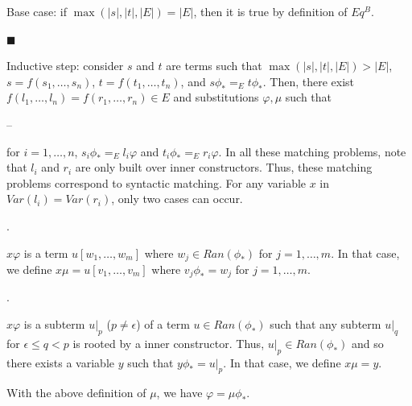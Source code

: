 Base case: if $\max(|s|,|t|,|E|)=|E|$, then it is true by definition of $Eq^{B}$.\par
 
 
 
\par\noindent  $\blacksquare$ 
 
Inductive step: consider $s$ and $t$ are terms such that $\max(|s|,|t|,|E|)>|E|$, $s=f(s_{1},\dots,s_{n})$, $t=f(t_{1},\dots,t_{n})$, and $s\phi_{*}=_{E}t\phi_{*}$. Then, there exist $f(l_{1},\dots,l_{n})=f(r_{1},\dots,r_{n})\in E$ and substitutions $\varphi,\mu$ such that\par
  
\par\noindent  – 
 
for $i=1,\dots,n$, $s_{i}\phi_{*}=_{E}l_{i}\varphi$ and $t_{i}\phi_{*}=_{E}r_{i}\varphi$. In all these matching problems, note that $l_{i}$ and $r_{i}$ are only built over inner constructors. Thus, these matching problems correspond to syntactic matching. For any variable $x$ in $\mathit{Var}(l_{i})=\mathit{Var}(r_{i})$, only two cases can occur.\par
 
 
  
\par{}. 
 
$x\varphi$ is a term $u[w_{1},\dots,w_{m}]$ where $w_{j}\in Ran(\phi_{*})$ for $j=1,\dots,m$. In that case, we define $x\mu=u[v_{1},\dots,v_{m}]$ where $v_{j}\phi_{*}=w_{j}$ for $j=1,\dots,m$.\par
 
 
 
\par{}. 
 
$x\varphi$ is a subterm $u|_{p}$ ($p\neq\epsilon$) of a term $u\in Ran(\phi_{*})$ such that any subterm $u|_{q}$ for $\epsilon\leq q<p$ is rooted by a inner constructor. Thus, $u|_{p}\in Ran(\phi_{*})$ and so there exists a variable $y$ such that $y\phi_{*}=u|_{p}$. In that case, we define $x\mu=y$.\par
 
 
  
With the above definition of $\mu$, we have $\varphi=\mu\phi_{*}$.\par
 

